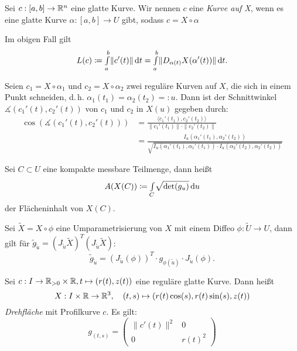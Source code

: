 \documentclass{cheat-sheet}
\newcommand{\Intabdt}[1]{\Int{a}{b}{#1}{t}}
\begin{document}
\begin{definition}
  Sei $c : [a, b] \to \mathbb{R}^n$ eine glatte Kurve. Wir nennen $c$ eine \emph{Kurve auf X}, wenn es eine glatte Kurve $\alpha : [a, b] \to U$ gibt, sodass $c = X \circ \alpha$
\end{definition}

\begin{bem}
  Im obigen Fall gilt
  \[ L(c) \coloneqq \Intabdt{\|c'(t)\|} = \Intabdt{\| D_{\alpha(t)} X(\alpha'(t)) \|}. \]
\end{bem}

\begin{bem}
  Seien $c_1 = X \circ \alpha_1$ und $c_2 = X \circ \alpha_2$ zwei reguläre Kurven auf $X$, die sich in einem Punkt schneiden, d.\,h. $\alpha_1(t_1) = \alpha_2(t_2) =: u$. Dann ist der Schnittwinkel $\measuredangle(c_1'(t), c_2'(t))$ von $c_1$ und $c_2$ in $X(u)$ gegeben durch:
  \begin{align*}
    \cos(\measuredangle(c_1'(t), c_2'(t))) &= \frac{\langle c_1'(t_1) , c_2'(t_2) \rangle}{\| c_1'(t_1) \| \cdot \| c_2'(t_2) \|} \\
    &= \frac{I_u(\alpha_1'(t_1), \alpha_2'(t_2))}{\sqrt{I_u(\alpha_1'(t_1), \alpha_1'(t_1)) \cdot I_u(\alpha_2'(t_2), \alpha_2'(t_2))}}
  \end{align*}
\end{bem}

\begin{definition}
  Sei $C \subset U$ eine kompakte messbare Teilmenge, dann heißt
  \[ A(X(C)) \coloneqq {\textstyle \int\limits_{C}^{}}  \sqrt{\det(g_u)}  \,\mathrm{d} u \]
  der Flächeninhalt von $X(C)$.
\end{definition}

\begin{satz}
  Sei $\tilde{X} = X \circ \phi$ eine Umparametrisierung von $X$ mit einem Diffeo $\phi : \tilde{U} \to U$, dann gilt für $\tilde{g}_{\tilde{u}} = (J_{\tilde{u}} \tilde{X})^T (J_{\tilde{u}} \tilde{X})$:
  \[ \tilde{g}_{\tilde{u}} = (J_{\tilde{u}}(\phi))^T \cdot g_{\phi(\tilde{u})} \cdot J_{\tilde{u}}(\phi). \]
\end{satz}

\begin{bsp}[Drehfläche]
  Sei $c : I \to \mathbb{R}_{> 0} \times \mathbb{R}, t \mapsto (r(t), z(t))$ eine reguläre glatte Kurve. Dann heißt
  \[ X : I \times \mathbb{R} \to \mathbb{R}^3, \quad (t, s) \mapsto (r(t) \cos(s), r(t) \sin(s), z(t)) \]
  \emph{Drehfläche} mit Profilkurve $c$. Es gilt:
  \[ g_{(t, s)} = \begin{pmatrix} \| c'(t) \|^2 & 0 \\ 0 & r(t)^2 \end{pmatrix} \]
\end{bsp}
\end{document}
